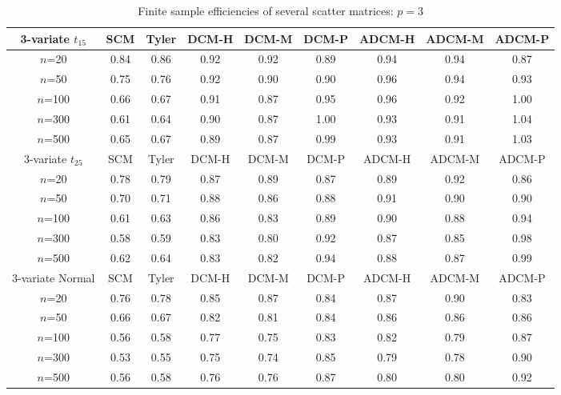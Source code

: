 \begin{table}[t]
\begin{scriptsize}
\begin{tabular}{c|cc|ccc|ccc}
    3-variate $t_{15}$ & SCM  & Tyler & DCM-H & DCM-M & DCM-P & ADCM-H & ADCM-M & ADCM-P \\ \hline
    $n$=20             & 0.84 & 0.86  & 0.92   & 0.92   & 0.89  & 0.94    & 0.94    & 0.87   \\
    $n$=50             & 0.75 & 0.76  & 0.92   & 0.90   & 0.90  & 0.96    & 0.94    & 0.93   \\
    $n$=100            & 0.66 & 0.67  & 0.91   & 0.87   & 0.95  & 0.96    & 0.92    & 1.00   \\
    $n$=300            & 0.61 & 0.64  & 0.90   & 0.87   & 1.00  & 0.93    & 0.91    & 1.04   \\
    $n$=500            & 0.65 & 0.67  & 0.89   & 0.87   & 0.99  & 0.93    & 0.91    & 1.03   \\ \hline
    3-variate $t_{25}$ & SCM  & Tyler & DCM-H & DCM-M & DCM-P & ADCM-H & ADCM-M & ADCM-P \\ \hline
    $n$=20             & 0.78 & 0.79  & 0.87   & 0.89   & 0.87  & 0.89    & 0.92    & 0.86   \\
    $n$=50             & 0.70 & 0.71  & 0.88   & 0.86   & 0.88  & 0.91    & 0.90    & 0.90   \\
    $n$=100            & 0.61 & 0.63  & 0.86   & 0.83   & 0.89  & 0.90    & 0.88    & 0.94   \\
    $n$=300            & 0.58 & 0.59  & 0.83   & 0.80   & 0.92  & 0.87    & 0.85    & 0.98   \\
    $n$=500            & 0.62 & 0.64  & 0.83   & 0.82   & 0.94  & 0.88    & 0.87    & 0.99   \\ \hline
    3-variate Normal   & SCM  & Tyler & DCM-H & DCM-M & DCM-P & ADCM-H & ADCM-M & ADCM-P \\ \hline
    $n$=20             & 0.76 & 0.78  & 0.85   & 0.87   & 0.84  & 0.87    & 0.90    & 0.83   \\
    $n$=50             & 0.66 & 0.67  & 0.82   & 0.81   & 0.84  & 0.86    & 0.86    & 0.86   \\
    $n$=100            & 0.56 & 0.58  & 0.77   & 0.75   & 0.83  & 0.82    & 0.79    & 0.87   \\
    $n$=300            & 0.53 & 0.55  & 0.75   & 0.74   & 0.85  & 0.79    & 0.78    & 0.90   \\
    $n$=500            & 0.56 & 0.58  & 0.76   & 0.76   & 0.87  & 0.80    & 0.80    & 0.92   \\ \hline
    \end{tabular}
\end{scriptsize}
\caption{Finite sample efficiencies of several scatter matrices: $p=3$}
\label{table:FSEtable3}
\end{table}
